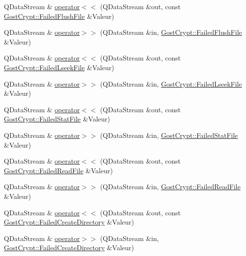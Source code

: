 \begin{DoxyCompactItemize}
\item 
Q\+Data\+Stream \& \hyperlink{namespace_gost_crypt_a7fe325fa6a2d8024c438723c68f28250}{operator$<$$<$} (Q\+Data\+Stream \&out, const \hyperlink{class_gost_crypt_1_1_failed_flush_file}{Gost\+Crypt\+::\+Failed\+Flush\+File} \&Valeur)
\item 
Q\+Data\+Stream \& \hyperlink{namespace_gost_crypt_aba02906a3e43411fed2623eb87901ca6}{operator$>$$>$} (Q\+Data\+Stream \&in, \hyperlink{class_gost_crypt_1_1_failed_flush_file}{Gost\+Crypt\+::\+Failed\+Flush\+File} \&Valeur)
\item 
Q\+Data\+Stream \& \hyperlink{namespace_gost_crypt_a3bf39c44968d5f8e6020dca9f7f8b1bd}{operator$<$$<$} (Q\+Data\+Stream \&out, const \hyperlink{class_gost_crypt_1_1_failed_lseek_file}{Gost\+Crypt\+::\+Failed\+Lseek\+File} \&Valeur)
\item 
Q\+Data\+Stream \& \hyperlink{namespace_gost_crypt_ade3d0ececb14827148355792f1b1b45c}{operator$>$$>$} (Q\+Data\+Stream \&in, \hyperlink{class_gost_crypt_1_1_failed_lseek_file}{Gost\+Crypt\+::\+Failed\+Lseek\+File} \&Valeur)
\item 
Q\+Data\+Stream \& \hyperlink{namespace_gost_crypt_a2a84fea66f94caa3fcd7ae107bdda4f0}{operator$<$$<$} (Q\+Data\+Stream \&out, const \hyperlink{class_gost_crypt_1_1_failed_stat_file}{Gost\+Crypt\+::\+Failed\+Stat\+File} \&Valeur)
\item 
Q\+Data\+Stream \& \hyperlink{namespace_gost_crypt_adaf523e4f87259058da16649dfd6df12}{operator$>$$>$} (Q\+Data\+Stream \&in, \hyperlink{class_gost_crypt_1_1_failed_stat_file}{Gost\+Crypt\+::\+Failed\+Stat\+File} \&Valeur)
\item 
Q\+Data\+Stream \& \hyperlink{namespace_gost_crypt_a752b69aa35f9eb0bdc04c6cd3f8442d1}{operator$<$$<$} (Q\+Data\+Stream \&out, const \hyperlink{class_gost_crypt_1_1_failed_read_file}{Gost\+Crypt\+::\+Failed\+Read\+File} \&Valeur)
\item 
Q\+Data\+Stream \& \hyperlink{namespace_gost_crypt_a4567bb753648732718d0ae4a6a87b305}{operator$>$$>$} (Q\+Data\+Stream \&in, \hyperlink{class_gost_crypt_1_1_failed_read_file}{Gost\+Crypt\+::\+Failed\+Read\+File} \&Valeur)
\item 
Q\+Data\+Stream \& \hyperlink{namespace_gost_crypt_aa79dec7c3603a9ca936bd927e7b7d908}{operator$<$$<$} (Q\+Data\+Stream \&out, const \hyperlink{class_gost_crypt_1_1_failed_create_directory}{Gost\+Crypt\+::\+Failed\+Create\+Directory} \&Valeur)
\item 
Q\+Data\+Stream \& \hyperlink{namespace_gost_crypt_a7eb09b5ed6b7bd62952382a0717a4dd0}{operator$>$$>$} (Q\+Data\+Stream \&in, \hyperlink{class_gost_crypt_1_1_failed_create_directory}{Gost\+Crypt\+::\+Failed\+Create\+Directory} \&Valeur)

\end{DoxyCompactItemize}
